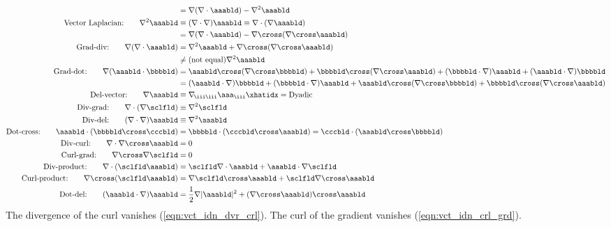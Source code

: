 \documentclass[12pt]{article}
\begin{document}
\begin{subequations}
\begin{align}
& = \nabla (\nabla \cdot \aaabld) - \nabla^{2} \aaabld \\
\label{eqn:vct_idn_lpl_vct}\mbox{Vector Laplacian:}\qquad 
\nabla^{2} \aaabld & \equiv (\nabla \cdot \nabla ) \aaabld \equiv \nabla \cdot (\nabla \aaabld) \\
& = \nabla (\nabla \cdot \aaabld) - \nabla \cross (\nabla \cross \aaabld) \\
\label{eqn:vct_idn_grd_dvr}\mbox{Grad-div:}\qquad
\nabla ( \nabla \cdot \aaabld ) & = \nabla^{2} \aaabld + \nabla \cross (\nabla \cross \aaabld) \\
& \ne \mbox{(not equal)} \nabla^{2} \aaabld \nonumber \\
\label{eqn:vct_idn_grd_dot}\mbox{Grad-dot:}\qquad
\nabla (\aaabld \cdot \bbbbld) & = %
\aaabld \cross (\nabla \cross \bbbbld) + \bbbbld \cross (\nabla \cross \aaabld) + 
(\bbbbld \cdot \nabla) \aaabld + (\aaabld \cdot \nabla) \bbbbld \nonumber \\
& =  %
( \aaabld \cdot \nabla ) \bbbbld + ( \bbbbld \cdot \nabla ) \aaabld +
\aaabld \cross ( \nabla \cross \bbbbld ) + \bbbbld \cross ( \nabla \cross \aaabld ) \\
\label{eqn:vct_idn_del_vct}\mbox{Del-vector:}\qquad
\nabla \aaabld & \equiv \nabla_{\!\iii\iii} \aaa_{\iii} \xhatidx = \mbox{Dyadic} \\
\label{eqn:vct_idn_dvr_grd}\mbox{Div-grad:}\qquad
\nabla \cdot ( \nabla \sclfld ) & \equiv \nabla^{2} \sclfld \\
\label{eqn:vct_idn_dvr_del}\mbox{Div-del:}\qquad
(\nabla \cdot \nabla ) \aaabld & \equiv \nabla^{2} \aaabld \\
\label{eqn:vct_idn_dot_crs}\mbox{Dot-cross:}\qquad
\aaabld \cdot (\bbbbld \cross \cccbld) & = 
\bbbbld \cdot (\cccbld \cross \aaabld) = 
\cccbld \cdot (\aaabld \cross \bbbbld) \\
\label{eqn:vct_idn_dvr_crl}\mbox{Div-curl:}\qquad
\nabla \cdot \nabla \cross \aaabld & = 0 \\
\label{eqn:vct_idn_crl_grd}\mbox{Curl-grad:}\qquad
\nabla \cross \nabla \sclfld & = 0 \\
\label{eqn:vct_idn_dvr_prd}\mbox{Div-product:}\qquad
\nabla \cdot (\sclfld \aaabld) & = 
\sclfld \nabla \cdot \aaabld + \aaabld \cdot \nabla \sclfld \\
\label{eqn:vct_idn_crl_prd}\mbox{Curl-product:}\qquad
\nabla \cross (\sclfld \aaabld) & = 
\nabla \sclfld \cross \aaabld + \sclfld \nabla \cross \aaabld \\
\label{eqn:vct_idn_dot_del}\mbox{Dot-del:}\qquad
(\aaabld \cdot \nabla) \aaabld & = 
\frac{1}{2} \nabla |\aaabld|^{2} + (\nabla \cross \aaabld) \cross \aaabld
\end{align}
\end{subequations} 
The divergence of the curl vanishes (\ref{eqn:vct_idn_dvr_crl}). 
The curl of the gradient vanishes (\ref{eqn:vct_idn_crl_grd}). 
\end{document}
